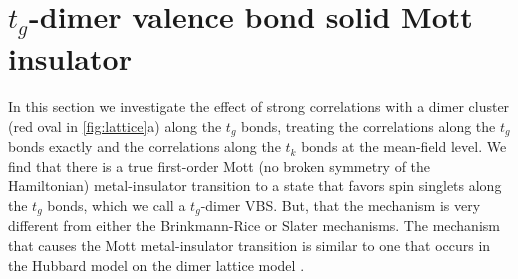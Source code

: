 \documentclass[reprint,aps,prb,amsmath,amssymb]{revtex4-2}
\begin{document}
%


\section{$t_g$-dimer valence bond solid Mott insulator}
\label{sec:tg-dimer}

In this section we investigate the effect of strong correlations with a dimer cluster (red oval in \cref{fig:lattice}a) along the $t_g$ bonds, treating the correlations along the $t_g$ bonds exactly and the correlations along the $t_k$ bonds at the mean-field level. We find that there is a true first-order Mott (no broken symmetry of the Hamiltonian) metal-insulator transition to a state that favors spin singlets along the $t_g$ bonds, which we call a $t_g$-dimer VBS. But, that the mechanism is very different from either the Brinkmann-Rice or Slater mechanisms. The mechanism that causes the Mott metal-insulator transition is similar to one that occurs in the Hubbard model on the dimer lattice model \cite{Fabrizio2007}.
\end{document}
